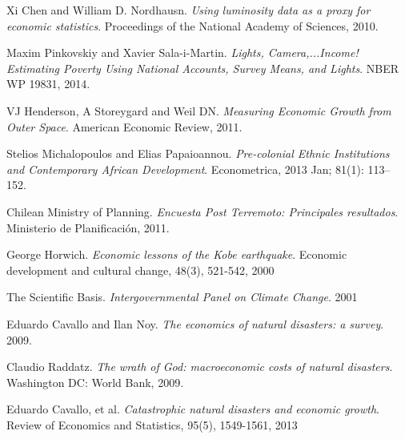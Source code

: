 \documentclass[12.5pt,fleqn,leqno,letterpaper]{article}
\begin{document}
\begin{thebibliography}{9}
	Xi Chen and William D. Nordhausn. 
	\textit{Using luminosity data as a proxy for economic statistics}. 
	Proceedings of the National Academy of Sciences, 2010.

	Maxim Pinkovskiy and Xavier Sala-i-Martin. 
	\textit{Lights, Camera,...Income! Estimating Poverty Using National Accounts, Survey Means, and Lights}. 
	NBER WP 19831, 2014.

	VJ Henderson, A Storeygard and Weil DN. 
	\textit{Measuring Economic Growth from Outer Space}. 
	American Economic Review, 2011.

	Stelios Michalopoulos and Elias Papaioannou. 
	\textit{Pre-colonial Ethnic Institutions and Contemporary African Development}. 
	Econometrica, 2013 Jan; 81(1): 113–152.

	Chilean Ministry of Planning. 
	\textit{Encuesta Post Terremoto: Principales resultados}. 
	Ministerio de Planificación, 2011.
	
	George Horwich.
	\textit{Economic lessons of the Kobe earthquake}. 
	Economic development and cultural change, 48(3), 521-542, 2000
	
	The Scientific Basis.
	\textit{Intergovernmental Panel on Climate Change}. 2001	
	
	Eduardo Cavallo and Ilan Noy. 
	\textit{The economics of natural disasters: a survey}. 2009.	
	
	Claudio Raddatz.
	\textit{The wrath of God: macroeconomic costs of natural disasters}. Washington DC: World Bank, 2009.
	
	Eduardo Cavallo, et al. \textit{Catastrophic natural disasters and economic growth}. Review of Economics and Statistics, 95(5), 1549-1561, 2013
	
\end{thebibliography}
\end{document}
